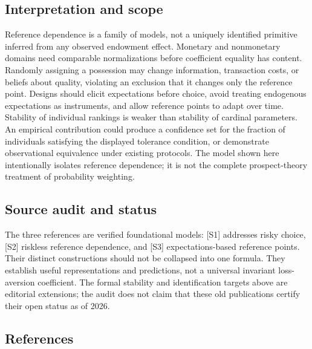 \documentclass[11pt,a4paper]{article}
\begin{document}
\subsection*{Interpretation and scope}

Reference dependence is a family of models, not a uniquely identified primitive inferred from any observed endowment effect. Monetary and nonmonetary domains need comparable normalizations before coefficient equality has content. Randomly assigning a possession may change information, transaction costs, or beliefs about quality, violating an exclusion that it changes only the reference point. Designs should elicit expectations before choice, avoid treating endogenous expectations as instruments, and allow reference points to adapt over time. Stability of individual rankings is weaker than stability of cardinal parameters. An empirical contribution could produce a confidence set for the fraction of individuals satisfying the displayed tolerance condition, or demonstrate observational equivalence under existing protocols. The model shown here intentionally isolates reference dependence; it is not the complete prospect-theory treatment of probability weighting.

\subsection*{Source audit and status}

The three references are verified foundational models: [S1] addresses risky choice, [S2] riskless reference dependence, and [S3] expectations-based reference points. Their distinct constructions should not be collapsed into one formula. They establish useful representations and predictions, not a universal invariant loss-aversion coefficient. The formal stability and identification targets above are editorial extensions; the audit does not claim that these old publications certify their open status as of 2026.

\subsection*{References}
\end{document}
